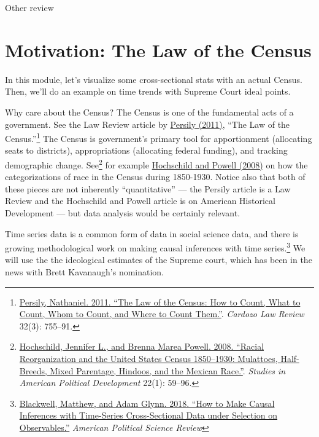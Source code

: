 \documentclass[]{book}
\let\rmarkdownfootnote\footnote%
\def\footnote{\protect\rmarkdownfootnote}
\theoremstyle{definition}
\theoremstyle{definition}
\theoremstyle{definition}
\theoremstyle{remark}
\begin{document}
Other review

\section{Motivation: The Law of the
Census}\label{motivation-the-law-of-the-census}

In this module, let's visualize some cross-sectional stats with an
actual Census. Then, we'll do an example on time trends with Supreme
Court ideal points.

Why care about the Census? The Census is one of the fundamental acts of
a government. See the Law Review article by
\href{http://cardozolawreview.com/Joomla1.5/content/32-3/Persily.32-3.pdf}{Persily
(2011)}, ``The Law of the Census.''\footnote{\href{http://cardozolawreview.com/Joomla1.5/content/32-3/Persily.32-3.pdf}{Persily,
  Nathaniel. 2011. ``The Law of the Census: How to Count, What to Count,
  Whom to Count, and Where to Count Them.''}. \emph{Cardozo Law Review}
  32(3): 755--91.} The Census is government's primary tool for
apportionment (allocating seats to districts), appropriations
(allocating federal funding), and tracking demographic change.
See\footnote{\href{https://dash.harvard.edu/bitstream/handle/1/3153295/hoschschild_racialreorganization.pdf?sequence=2}{Hochschild,
  Jennifer L., and Brenna Marea Powell. 2008. ``Racial Reorganization
  and the United States Census 1850--1930: Mulattoes, Half-Breeds, Mixed
  Parentage, Hindoos, and the Mexican Race.''}. \emph{Studies in
  American Political Development} 22(1): 59--96.} for example
\href{https://dash.harvard.edu/bitstream/handle/1/3153295/hoschschild_racialreorganization.pdf?sequence=2}{Hochschild
and Powell (2008)} on how the categorizations of race in the Census
during 1850-1930. Notice also that both of these pieces are not
inherently ``quantitative'' --- the Persily article is a Law Review and
the Hochschild and Powell article is on American Historical Development
--- but data analysis would be certainly relevant.

Time series data is a common form of data in social science data, and
there is growing methodological work on making causal inferences with
time series.\footnote{\href{https://doi.org/10.1017/S0003055418000357}{Blackwell,
  Matthew, and Adam Glynn. 2018. ``How to Make Causal Inferences with
  Time-Series Cross-Sectional Data under Selection on Observables.''}
  \emph{American Political Science Review}} We will use the the
ideological estimates of the Supreme court, which has been in the news
with Brett Kavanaugh's nomination.
\end{document}

